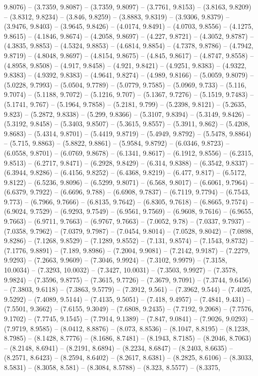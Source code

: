 9.8076) -- (3.7359, 9.8087) -- (3.7359, 9.8097) -- (3.7761, 9.8153) -- (3.8163, 9.8209) -- (3.8312, 9.8234) -- (3.846, 9.8259) -- (3.8883, 9.8319) -- (3.9306, 9.8379) -- (3.9476, 9.8403) -- (3.9645, 9.8426) -- (4.0174, 9.8491) -- (4.0703, 9.8556) -- (4.1275, 9.8615) -- (4.1846, 9.8674) -- (4.2058, 9.8697) -- (4.227, 9.8721) -- (4.3052, 9.8787) -- (4.3835, 9.8853) -- (4.5324, 9.8853) -- (4.6814, 9.8854) -- (4.7378, 9.8786) -- (4.7942, 9.8719) -- (4.8048, 9.8697) -- (4.8154, 9.8675) -- (4.845, 9.8617) -- (4.8747, 9.8558) -- (4.8958, 9.8508) -- (4.917, 9.8458) -- (4.921, 9.8421) -- (4.9251, 9.8383) -- (4.9322, 9.8383) -- (4.9392, 9.8383) -- (4.9641, 9.8274) -- (4.989, 9.8166) -- (5.0059, 9.8079) -- (5.0228, 9.7993) -- (5.0504, 9.7789) -- (5.0779, 9.7585) -- (5.0969, 9.733) -- (5.116, 9.7074) -- (5.1188, 9.7072) -- (5.1216, 9.707) -- (5.1367, 9.7276) -- (5.1519, 9.7483) -- (5.1741, 9.767) -- (5.1964, 9.7858) -- (5.2181, 9.799) -- (5.2398, 9.8121) -- (5.2635, 9.823) -- (5.2872, 9.8338) -- (5.299, 9.8366) -- (5.3107, 9.8394) -- (5.3149, 9.8426) -- (5.3192, 9.8458) -- (5.3403, 9.8507) -- (5.3615, 9.8557) -- (5.3911, 9.862) -- (5.4208, 9.8683) -- (5.4314, 9.8701) -- (5.4419, 9.8719) -- (5.4949, 9.8792) -- (5.5478, 9.8864) -- (5.715, 9.8863) -- (5.8822, 9.8861) -- (5.9584, 9.8792) -- (6.0346, 9.8723) -- (6.0558, 9.8701) -- (6.0769, 9.8678) -- (6.1341, 9.8617) -- (6.1912, 9.8556) -- (6.2315, 9.8513) -- (6.2717, 9.8471) -- (6.2928, 9.8429) -- (6.314, 9.8388) -- (6.3542, 9.8337) -- (6.3944, 9.8286) -- (6.4156, 9.8252) -- (6.4368, 9.8219) -- (6.477, 9.817) -- (6.5172, 9.8122) -- (6.5236, 9.8096) -- (6.5299, 9.8071) -- (6.568, 9.8017) -- (6.6061, 9.7964) -- (6.6379, 9.7922) -- (6.6696, 9.788) -- (6.6908, 9.7837) -- (6.7119, 9.7794) -- (6.7543, 9.773) -- (6.7966, 9.7666) -- (6.8135, 9.7642) -- (6.8305, 9.7618) -- (6.8665, 9.7574) -- (6.9024, 9.7529) -- (6.9293, 9.7549) -- (6.9561, 9.7569) -- (6.9608, 9.7616) -- (6.9655, 9.7663) -- (6.9711, 9.7663) -- (6.9767, 9.7663) -- (7.0052, 9.78) -- (7.0337, 9.7937) -- (7.0358, 9.7962) -- (7.0379, 9.7987) -- (7.0454, 9.8014) -- (7.0528, 9.8042) -- (7.0898, 9.8286) -- (7.1268, 9.8529) -- (7.1289, 9.8552) -- (7.131, 9.8574) -- (7.1543, 9.8732) -- (7.1776, 9.8891) -- (7.189, 9.8986) -- (7.2004, 9.9081) -- (7.2142, 9.9187) -- (7.2279, 9.9293) -- (7.2663, 9.9609) -- (7.3046, 9.9924) -- (7.3102, 9.9979) -- (7.3158, 10.0034) -- (7.3293, 10.0032) -- (7.3427, 10.0031) -- (7.3503, 9.9927) -- (7.3578, 9.9824) -- (7.3596, 9.8775) -- (7.3615, 9.7726) -- (7.3679, 9.7091) -- (7.3744, 9.6456) -- (7.3803, 9.6118) -- (7.3863, 9.5779) -- (7.3912, 9.561) -- (7.3962, 9.544) -- (7.4025, 9.5292) -- (7.4089, 9.5144) -- (7.4135, 9.5051) -- (7.418, 9.4957) -- (7.4841, 9.431) -- (7.5501, 9.3662) -- (7.6155, 9.3049) -- (7.6808, 9.2435) -- (7.7192, 9.2068) -- (7.7576, 9.1702) -- (7.7745, 9.1545) -- (7.7914, 9.1389) -- (7.847, 9.0841) -- (7.9026, 9.0293) -- (7.9719, 8.9585) -- (8.0412, 8.8876) -- (8.073, 8.8536) -- (8.1047, 8.8195) -- (8.1238, 8.7985) -- (8.1428, 8.7776) -- (8.1686, 8.7481) -- (8.1943, 8.7185) -- (8.2046, 8.7063) -- (8.2148, 8.6941) -- (8.2191, 8.6894) -- (8.2234, 8.6847) -- (8.2403, 8.6635) -- (8.2571, 8.6423) -- (8.2594, 8.6402) -- (8.2617, 8.6381) -- (8.2825, 8.6106) -- (8.3033, 8.5831) -- (8.3058, 8.581) -- (8.3084, 8.5788) -- (8.323, 8.5577) -- (8.3375, 